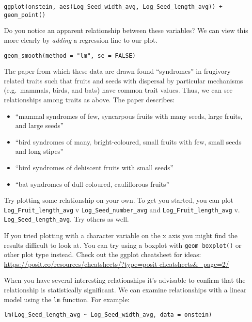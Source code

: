 \documentclass[
]{book}
\providecommand{\tightlist}{%
  \setlength{\itemsep}{0pt}\setlength{\parskip}{0pt}}
\begin{document}
\begin{verbatim}
ggplot(onstein, aes(Log_Seed_width_avg, Log_Seed_length_avg)) + geom_point()
\end{verbatim}

Do you notice an apparent relationship between these variables?
We can view this more clearly by \emph{adding} a regression line to our plot.

\begin{verbatim}
geom_smooth(method = "lm", se = FALSE)
\end{verbatim}

The paper from which these data are drawn found ``syndromes'' in frugivory-related traits
such that fruits and seeds with dispersal by particular mechanisms (e.g.~mammals, birds, and bats) have common trait values.
Thus, we can see relationships among traits as above.
The paper describes:

\begin{itemize}
\tightlist
\item
  ``mammal syndromes of few, syncarpous fruits with many seeds, large fruits, and large seeds''
\item
  ``bird syndromes of many, bright-coloured, small fruits with few, small seeds and long stipes''
\item
  ``bird syndromes of dehiscent fruits with small seeds''
\item
  ``bat syndromes of dull-coloured, cauliflorous fruits''
\end{itemize}

Try plotting some relationship on your own. To get you started, you can plot \texttt{Log\_Fruit\_length\_avg} v \texttt{Log\_Seed\_number\_avg} and \texttt{Log\_Fruit\_length\_avg} v. \texttt{Log\_Seed\_length\_avg}. Try others as well.

If you tried plotting with a character variable on the x axis you might find the results difficult to look at.
You can try using a boxplot with \texttt{geom\_boxplot()} or other plot type instead.
Check out the ggplot cheatsheet for ideas: \url{https://posit.co/resources/cheatsheets/?type=posit-cheatsheets\&_page=2/}

When you have several interesting relationships it's advisable to confirm that the relationship is statistically significant.
We can examine relationships with a linear model using the \texttt{lm} function.
For example:

\begin{verbatim}
lm(Log_Seed_length_avg ~ Log_Seed_width_avg, data = onstein)
\end{verbatim}
\end{document}
